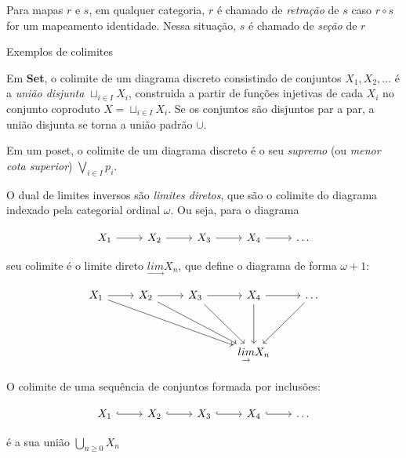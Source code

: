 \documentclass[../main.tex]{subfiles}
\begin{document}
\begin{definition}
    Para mapas $r$ e $s$, em qualquer categoria, $r$ é chamado de \emph{retração} de $s$ caso $r \circ s$ for um mapeamento identidade. Nessa situação, $s$ é chamado de \emph{seção} de $r$
\end{definition}

Exemplos de colimites

Em \textbf{Set}, o colimite de um diagrama discreto consistindo de conjuntos $X_1, X_2, \dots$ é a \emph{união disjunta} $\sqcup_{i \in I} X_i$, construida a partir de funções injetivas de cada $X_i$ no conjunto coproduto $X =  \sqcup_{i \in I} X_i$. Se os conjuntos são disjuntos par a par, a união disjunta se torna a união padrão $\cup$.

Em um poset, o colimite de um diagrama discreto é o seu \emph{supremo} (ou \emph{menor cota superior}) $\bigvee_{i \in I} p_i$.

O dual de limites inversos são \emph{limites diretos}, que são o colimite do diagrama indexado pela categorial ordinal $\omega$. Ou seja, para o diagrama

\[\begin{tikzcd}
	{X_1} & {X_2} & {X_3} & {X_4} & \dots
	\arrow[from=1-1, to=1-2]
	\arrow[from=1-2, to=1-3]
	\arrow[from=1-3, to=1-4]
	\arrow[from=1-4, to=1-5]
\end{tikzcd}\]

seu colimite é o limite direto $\underset{\to}{lim} X_n$, que define o diagrama de forma $\omega + 1$:

\[\begin{tikzcd}
	{X_1} & {X_2} & {X_3} & {X_4} & \dots \\
	\\
	&&& {\underset{\to}{lim} X_n}
	\arrow[from=1-1, to=1-2]
	\arrow[from=1-1, to=3-4]
	\arrow[from=1-2, to=1-3]
	\arrow[from=1-2, to=3-4]
	\arrow[from=1-3, to=1-4]
	\arrow[from=1-3, to=3-4]
	\arrow[from=1-4, to=1-5]
	\arrow[from=1-4, to=3-4]
	\arrow[from=1-5, to=3-4]
\end{tikzcd}\]

O colimite de uma sequência de conjuntos formada por inclusões:

\[\begin{tikzcd}
	{X_1} & {X_2} & {X_3} & {X_4} & \dots
	\arrow[hook, from=1-1, to=1-2]
	\arrow[hook, from=1-2, to=1-3]
	\arrow[hook, from=1-3, to=1-4]
	\arrow[hook, from=1-4, to=1-5]
\end{tikzcd}\]

é a sua união $\bigcup_{n \geq 0} X_n$
\end{document}
